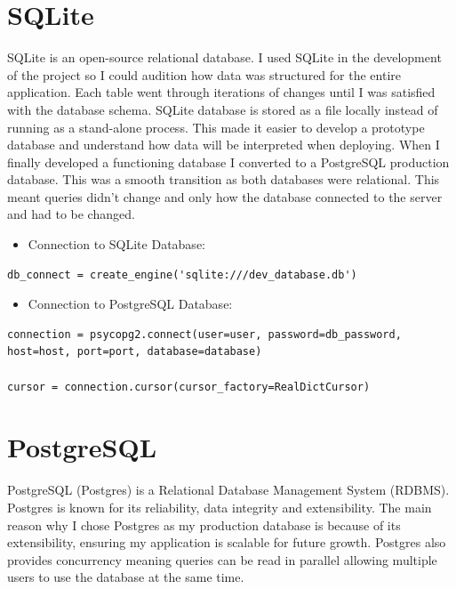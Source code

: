 \section{SQLite}
SQLite is an open-source relational database. I used SQLite in the development of the project so I could audition how data was structured for the entire application. Each table went through iterations of changes until I was satisfied with the database schema. SQLite database is stored as a file locally \cite{newman2004sqlite} instead of running as a stand-alone process.
This made it easier to develop a prototype database and understand how data will be interpreted when deploying.
When I finally developed a functioning database I converted to a PostgreSQL production database. This was a smooth transition as both databases were relational. This meant queries didn't change and only how the database connected to the server and had to be changed.

\newpage
\begin{itemize}
	\item Connection to SQLite Database:
\end{itemize}

 \begin{verbatim}
db_connect = create_engine('sqlite:///dev_database.db')
\end{verbatim}

\begin{itemize}
	\item Connection to PostgreSQL Database:
\end{itemize}

\begin{verbatim}
connection = psycopg2.connect(user=user, password=db_password, host=host, port=port, database=database)

cursor = connection.cursor(cursor_factory=RealDictCursor)
\end{verbatim}
\section{PostgreSQL}
PostgreSQL (Postgres) is a Relational Database Management System (RDBMS). 
\cite{postgresql1996postgresql} Postgres is known for its reliability, data integrity and extensibility. The main reason why I chose Postgres as my production database is because of its extensibility, ensuring my application is scalable for future growth. Postgres also provides concurrency meaning queries can be read in parallel allowing multiple users to use the database at the same time.
